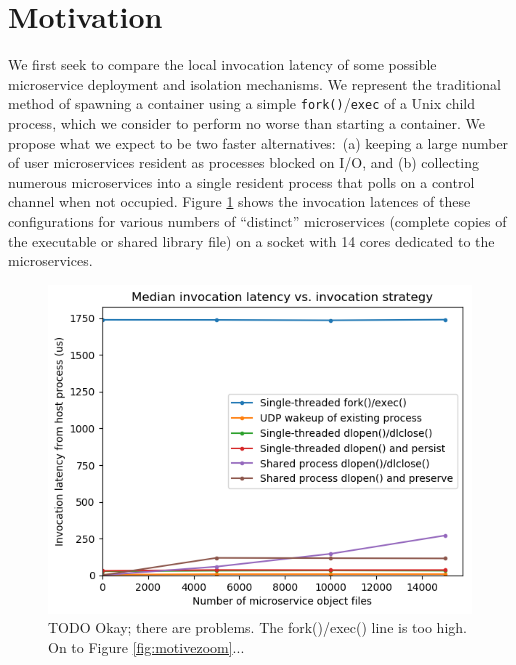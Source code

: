 \section{Motivation}
\label{sec:motive}

We first seek to compare the local invocation latency of some possible microservice deployment and isolation mechanisms.
We represent the traditional method of spawning a container using a simple \texttt{fork()}/\texttt{exec} of a Unix child process, which we consider to perform no worse than starting a container.
We propose what we expect to be two faster alternatives:\ (a) keeping a large number of user microservices resident as processes blocked on I/O, and (b) collecting numerous microservices into a single resident process that polls on a control channel when not occupied.
Figure \ref{fig:motive} shows the invocation latences of these configurations for various numbers of ``distinct'' microservices (complete copies of the executable or shared library file) on a socket with 14 cores dedicated to the microservices.

\begin{figure}
\includegraphics[width=\columnwidth]{figs/2017-18-29-motivation_numfuns-median}
\caption{TODO Okay; there are problems. The fork()/exec() line is too high. On to Figure \ref{fig:motivezoom}...}
\label{fig:motive}
\end{figure}

